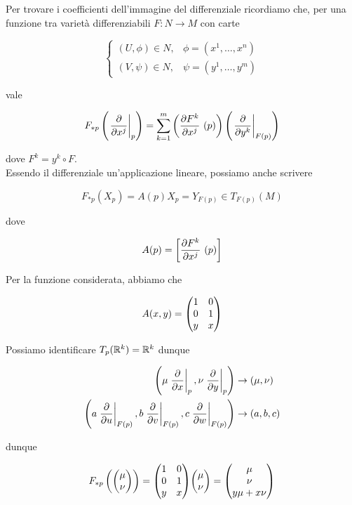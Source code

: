 Per trovare i coefficienti dell'immagine del differenziale ricordiamo che, per una funzione tra varietà differenziabili $ F : N \to M $ con carte

\begin{equation}
	\begin{cases}
		(U,\phi) \in N, & \phi = (x^{1},\dots,x^{n})\\
		(V,\psi) \in N, & \psi = (y^{1},\dots,y^{m})
	\end{cases}
\end{equation}

vale

\begin{equation}
	F_{*p} \left( \eval{\pdv{x^{j}}}_{p} \right) = \sum_{k=1}^{m} \left( \pdv{F^{k}}{x^{j}}\ (p) \right) \left( \eval{\pdv{y^{k}}}_{F(p)} \right)
\end{equation}

dove $ F^{k} = y^{k} \circ F $.\\
Essendo  il differenziale un'applicazione lineare, possiamo anche scrivere

\begin{equation}
	F_{*p} (X_{p}) = A(p) X_{p} = Y_{F(p)} \in T_{F(p)}(M)
\end{equation}

dove

\begin{equation}
	A(p) = \left[ \pdv{F^{k}}{x^{j}}\ (p) \right]
\end{equation}

Per la funzione considerata, abbiamo che

\begin{equation}
	A(x,y) = \mqty( 1 & 0 \\ 0 & 1 \\ y & x )
\end{equation}

Possiamo identificare $ T_{p}(\mathbb{R}^{k}) = \mathbb{R}^{k} $ dunque

\begin{align}
	\begin{split}
		\left( \mu \eval{\pdv{x}}_{p}, \nu \eval{\pdv{y}}_{p} \right) &\to (\mu,\nu)\\
		\left( a \eval{\pdv{u}}_{F(p)}, b \eval{\pdv{v}}_{F(p)}, c \eval{\pdv{w}}_{F(p)} \right) &\to (a,b,c)
	\end{split}
\end{align}

dunque

\begin{equation}
	F_{*p} \left( \mqty( \mu \\ \nu ) \right) = \mqty( 1 & 0 \\ 0 & 1 \\ y & x ) \mqty( \mu \\ \nu ) = \mqty( \mu \\ \nu \\ y \mu + x \nu )
\end{equation}


